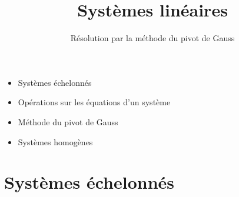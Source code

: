 






\title{{\bf Systèmes linéaires}}
\subtitle{Résolution par la méthode du pivot de Gauss}

\begin{frame}
  
  \debutmontitre

  \pause

{\footnotesize
\hfill
{}
\begin{minipage}{0.6\textwidth}
  \begin{itemize}
    \item<3-> Systèmes échelonnés
    \item<4-> Opérations sur les équations d'un système
    \item<5-> Méthode du pivot de Gauss
    \item<6-> Systèmes homogènes  
  \end{itemize}
\end{minipage}
}

\end{frame}

\setcounter{framenumber}{0}


\section{Systèmes échelonnés}


